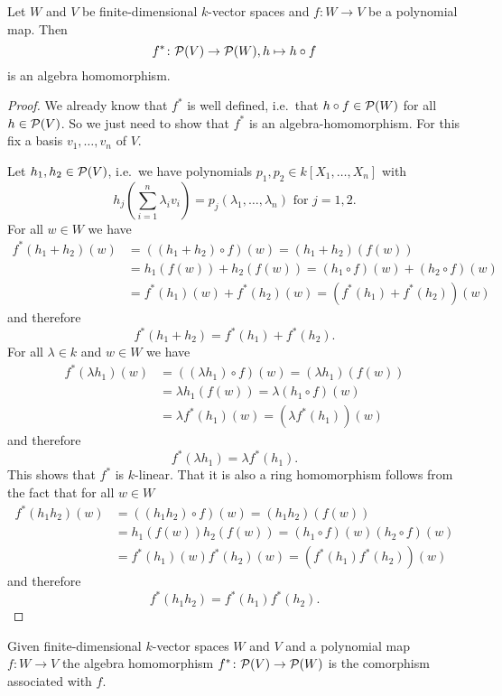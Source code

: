 \begin{lem}
 Let $W$ and $V$ be finite-dimensional $k$-vector spaces and $f \colon W \to V$ be a polynomial map. Then
 \[
  f^* \colon \mathcal{P}(V) \to \mathcal{P}(W), h \mapsto h \circ f
 \]
 is an algebra homomorphism.
\end{lem}
\begin{proof}
 We already know that $f^*$ is well defined, i.e.\ that $h \circ f \in \mathcal{P}(W)$ for all $h \in \mathcal{P}(V)$. So we just need to show that $f^*$ is an algebra-homomorphism. For this fix a basis $v_1, \dotsc, v_n$ of $V$.
 
 Let $h_1, h_2\in \mathcal{P}(V)$, i.e.\ we have polynomials $p_1, p_2\in k[X_1, \dotsc, X_n]$ with
 \[
  h_j\left(\sum_{i=1}^n \lambda_i v_i\right) = p_j(\lambda_1, \dotsc, \lambda_n) \text{ for } j=1,2.
 \]
 For all $w \in W$ we have
 \begin{align*}
  f^*(h_1+h_2)(w)
  &= ((h_1 + h_2) \circ f)(w)
  = (h_1 + h_2)(f(w)) \\
  &= h_1(f(w)) + h_2(f(w))
  = (h_1 \circ f)(w) + (h_2 \circ f)(w) \\
  &= f^*(h_1)(w) + f^*(h_2)(w)
  = (f^*(h_1)+f^*(h_2))(w)
 \end{align*}
 and therefore
 \[
  f^*(h_1+h_2) = f^*(h_1) + f^*(h_2).
 \]
 For all $\lambda \in k$ and $w \in W$ we have
 \begin{align*}
  f^*(\lambda h_1)(w)
  &= ((\lambda h_1) \circ f)(w)
  = (\lambda h_1)(f(w)) \\
  &= \lambda h_1(f(w))
  = \lambda (h_1 \circ f)(w) \\
  &= \lambda f^*(h_1)(w)
  = (\lambda f^*(h_1))(w)
 \end{align*}
 and therefore
 \[
  f^*(\lambda h_1) = \lambda f^*(h_1).
 \]
 This shows that $f^*$ is $k$-linear. That it is also a ring homomorphism follows from the fact that for all $w \in W$
 \begin{align*}
  f^*(h_1 h_2)(w)
  &= ((h_1 h_2) \circ f)(w)
  = (h_1 h_2)(f(w)) \\
  &= h_1(f(w)) h_2(f(w))
  = (h_1 \circ f)(w) (h_2 \circ f)(w) \\
  &= f^*(h_1)(w) f^*(h_2)(w)
  = (f^*(h_1) f^*(h_2))(w)
 \end{align*}
 and therefore
 \[
  f^*(h_1 h_2) = f^*(h_1) f^*(h_2).
 \]
\end{proof}


\begin{defi}
 Given finite-dimensional $k$-vector spaces $W$ and $V$ and a polynomial map $f \colon W \to V$ the algebra homomorphism $f^* \colon \mathcal{P}(V) \to \mathcal{P}(W)$ is the comorphism associated with $f$.
\end{defi}
 

